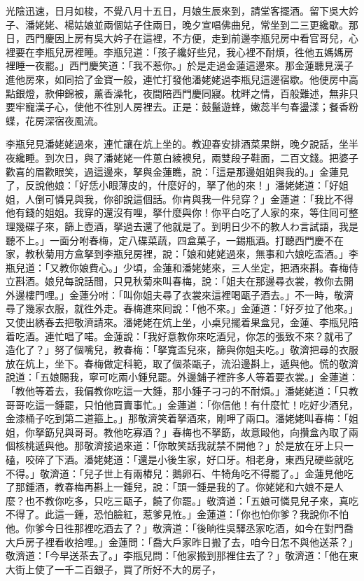 光陰迅速，日月如梭，不覺八月十五日，月娘生辰來到，請堂客擺酒。留下吳大妗子、潘姥姥、楊姑娘並兩個姑子住兩日，晚夕宣唱佛曲兒，常坐到二三更纔歇。那日，西門慶因上房有吳大妗子在這裡，不方便，走到前邊李瓶兒房中看官哥兒，心裡要在李瓶兒房裡睡。李瓶兒道：「孩子纔好些兒，我心裡不耐煩，徃他五媽媽房裡睡一夜罷。」{}西門慶笑道：「我不惹你。」於是走過金蓮這邊來。那金蓮聽見漢子進他房來，如同拾了金寶一般，連忙打發他潘姥姥過李瓶兒這邊宿歇。他便房中高點銀燈，款伸錦被，薰香澡牝，夜間陪西門慶同寢。枕畔之情，百般難述，無非只要牢寵漢子心，使他不徃別人房裡去。正是：鼓鬣遊蜂，嫩蕊半勻春盪漾；餐香粉蝶，花房深宿夜風流。

李瓶兒見潘姥姥過來，連忙讓在炕上坐的。教迎春安排酒菜果餅，晚夕說話，坐半夜纔睡。到次日，與了潘姥姥一件蔥白綾襖兒，兩雙段子鞋面，二百文錢。把婆子歡喜的眉歡眼笑，過這邊來，拏與金蓮瞧，說：「這是那邊姐姐與我的。」金蓮見了，反說他娘：「好恁小眼薄皮的，什麼好的，拏了他的來！」潘姥姥道：「好姐姐，人倒可憐見與我，你卻說這個話。你肯與我一件兒穿？」金蓮道：「我比不得他有錢的姐姐。我穿的還沒有哩，拏什麼與你！你平白吃了人家的來，等住囘可整理幾碟子來，篩上壺酒，拏過去還了他就是了。到明日少不的教人わ言試語，我是聽不上。」{}一面分咐春梅，定八碟菜蔬，四盒菓子，一錫瓶酒。打聽西門慶不在家，教秋菊用方盒拏到李瓶兒房裡，說：「娘和姥姥過來，無事和六娘吃盃酒。」李瓶兒道：「又教你娘費心。」少頃，金蓮和潘姥姥來，三人坐定，把酒來斟。春梅侍立斟酒。娘兒每說話間，只見秋菊來叫春梅，說：「姐夫在那邊尋衣裳，教你去開外邊樓門哩。」金蓮分咐：「叫你姐夫尋了衣裳來這裡喝甌子酒去。」不一時，敬濟尋了幾家衣服，就徃外走。春梅進來囘說：「他不來。」金蓮道：「好歹拉了他來。」又使出綉春去把敬濟請來。潘姥姥在炕上坐，小桌兒擺着果盒兒，金蓮、李瓶兒陪着吃酒。連忙唱了喏。金蓮說：「我好意教你來吃酒兒，你怎的張致不來？就弔了造化了？」努了個嘴兒，教春梅：「拏寬盃兒來，篩與你姐夫吃。」敬濟把尋的衣服放在炕上，坐下。春梅做定科範，取了個茶甌子，流沿邊斟上，遞與他。慌的敬濟說道：「五娘賜我，寧可吃兩小鍾兒罷。外邊鋪子裡許多人等着要衣裳。」金蓮道：「教他等着去，我偏教你吃這一大鍾，那小鍾子刁刁的不耐煩。」潘姥姥道：「只教哥哥吃這一鍾罷，只怕他買賣事忙。」金蓮道：「你信他！有什麼忙！吃好少酒兒，金漆桶子吃到第二道箍上。」那敬濟笑着拏酒來，剛呷了兩口。潘姥姥叫春梅：「姐姐，你拏筯兒與哥哥。教他吃寡酒？」春梅也不拏筯，故意毆他，向攢盒內取了兩個核桃遞與他。{}那敬濟接過來道：「你敢笑話我就禁不開他？」於是放在牙上只一磕，咬碎了下酒。潘姥姥道：「還是小後生家，好口牙。相老身，東西兒硬些就吃不得。」敬濟道：「兒子世上有兩樁兒：鵝卵石、牛犄角吃不得罷了。」金蓮見他吃了那鍾酒，教春梅再斟上一鍾兒，說：「頭一鍾是我的了。你姥姥和六娘不是人麼？也不教你吃多，只吃三甌子，饒了你罷。」敬濟道：「五娘可憐見兒子來，真吃不得了。此這一鍾，恐怕臉紅，惹爹見恠。」金蓮道：「你也怕你爹？我說你不怕他。{}你爹今日徃那裡吃酒去了？」敬濟道：「後晌徃吳驛丞家吃酒，如今在對門喬大戶房子裡看收拾哩。」金蓮問：「喬大戶家昨日搬了去，咱今日怎不與他送茶？」敬濟道：「今早送茶去了。」李瓶兒問：「他家搬到那裡住去了？」敬濟道：「他在東大街上使了一千二百銀子，買了所好不大的房子，